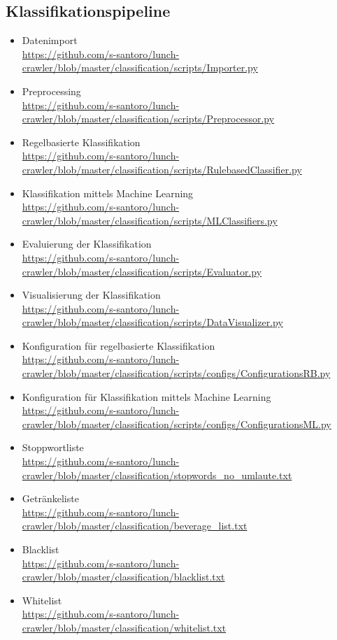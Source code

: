 \subsection{Klassifikationspipeline}
\label{app:classification}
\begin{itemize}
	\item Datenimport\\ 
	\url{https://github.com/s-santoro/lunch-crawler/blob/master/classification/scripts/Importer.py}
	\item Preprocessing\\ 
	\url{https://github.com/s-santoro/lunch-crawler/blob/master/classification/scripts/Preprocessor.py}
	\item Regelbasierte Klassifikation\\ 
	\url{https://github.com/s-santoro/lunch-crawler/blob/master/classification/scripts/RulebasedClassifier.py}
	\item Klassifikation mittels Machine Learning\\ 
	\url{https://github.com/s-santoro/lunch-crawler/blob/master/classification/scripts/MLClassifiers.py}
	\item Evaluierung der Klassifikation\\ 
	\url{https://github.com/s-santoro/lunch-crawler/blob/master/classification/scripts/Evaluator.py}
	\item Visualisierung der Klassifikation\\ 
	\url{https://github.com/s-santoro/lunch-crawler/blob/master/classification/scripts/DataVisualizer.py}
	\item Konfiguration für regelbasierte Klassifikation\\ 
	\url{https://github.com/s-santoro/lunch-crawler/blob/master/classification/scripts/configs/ConfigurationsRB.py}
	\item Konfiguration für Klassifikation mittels Machine Learning\\ 
	\url{https://github.com/s-santoro/lunch-crawler/blob/master/classification/scripts/configs/ConfigurationsML.py}
	\item Stoppwortliste\\ 
	\url{https://github.com/s-santoro/lunch-crawler/blob/master/classification/stopwords_no_umlaute.txt}
	\item Getränkeliste\\ 
	\url{https://github.com/s-santoro/lunch-crawler/blob/master/classification/beverage_list.txt}
	\item Blacklist\\ 
	\url{https://github.com/s-santoro/lunch-crawler/blob/master/classification/blacklist.txt}
	\item Whitelist\\ 
	\url{https://github.com/s-santoro/lunch-crawler/blob/master/classification/whitelist.txt}
\end{itemize} 
